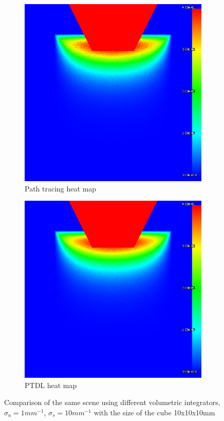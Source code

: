\begin{figure}
\begin{subfigure}{0.3\textwidth}
        \includegraphics[width=\textwidth]{imgs/renders/cube_area_path_heat}
        \caption{Path tracing heat map}
    \end{subfigure}
    \begin{subfigure}{0.3\textwidth}
        \includegraphics[width=\textwidth]{imgs/renders/cube_area_ptdl_heat}
        \caption{PTDL heat map}
    \end{subfigure}
    \caption{Comparison of the same scene using different volumetric integrators,
    $\sigma_a=1mm^{-1}$, $\sigma_s=10mm^{-1}$ with the size of the cube 10x10x10mm}
    \label{fig:cube_area_compare}
\end{figure}

